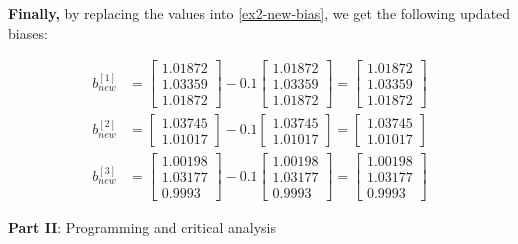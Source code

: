 \documentclass[12pt]{article}
\begin{document}
\begin{enumerate}[leftmargin=\labelsep]
          \textbf{Finally,} by replacing the values into \eqref{ex2-new-bias}, we get the following updated biases:

          \vskip -0.2cm
          \begin{align*}
              b^{[1]}_{new} &= \begin{bmatrix} 1.01872 \\ 1.03359 \\ 1.01872\end{bmatrix} - 0.1 \begin{bmatrix} 1.01872 \\ 1.03359 \\ 1.01872\end{bmatrix}
                  = \begin{bmatrix} 1.01872 \\ 1.03359 \\ 1.01872\end{bmatrix} \\
              b^{[2]}_{new} &= \begin{bmatrix} 1.03745 \\ 1.01017\end{bmatrix} - 0.1 \begin{bmatrix} 1.03745 \\ 1.01017\end{bmatrix}
                  = \begin{bmatrix} 1.03745 \\ 1.01017\end{bmatrix} \\
              b^{[3]}_{new} &= \begin{bmatrix} 1.00198 \\ 1.03177 \\ 0.9993\end{bmatrix} - 0.1 \begin{bmatrix} 1.00198 \\ 1.03177 \\ 0.9993\end{bmatrix}
                  = \begin{bmatrix} 1.00198 \\ 1.03177 \\ 0.9993\end{bmatrix}
          \end{align*}
\end{enumerate}

\pagebreak

\begin{center}
\large{\textbf{Part II}: Programming and critical analysis}\normalsize
\end{center}
\end{document}
